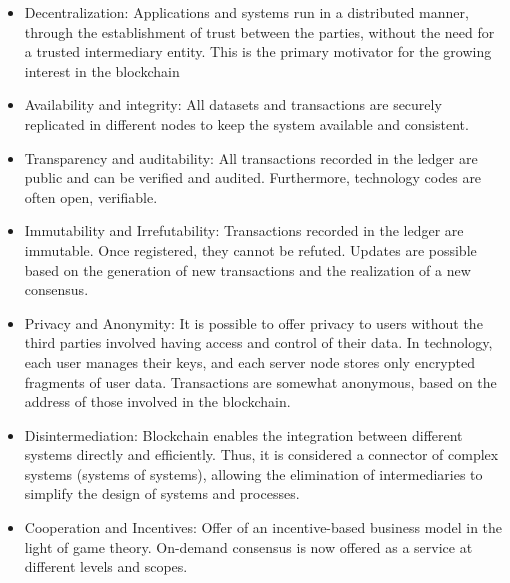 \begin{itemize}
\item Decentralization: Applications and systems run in a distributed manner, through the establishment of trust between the parties, without the need for a trusted intermediary entity. This is the primary motivator for the growing interest in the blockchain
\item Availability and integrity: All datasets and transactions are securely replicated in different nodes to keep the system available and consistent.
\item Transparency and auditability: All transactions recorded in the ledger are public and can be verified and audited. Furthermore, technology codes are often open, verifiable.
\item Immutability and Irrefutability: Transactions recorded in the ledger are immutable. Once registered, they cannot be refuted. Updates are possible based on the generation of new transactions and the realization of a new consensus.
\item Privacy and Anonymity: It is possible to offer privacy to users without the third parties involved having access and control of their data. In technology, each user manages their keys, and each server node stores only encrypted fragments of user data. Transactions are somewhat anonymous, based on the address of those involved in the blockchain.
\item Disintermediation: Blockchain enables the integration between different systems directly and efficiently. Thus, it is considered a connector of complex systems (systems of systems), allowing the elimination of intermediaries to simplify the design of systems and processes.
\item Cooperation and Incentives: Offer of an incentive-based business model in the light of game theory. On-demand consensus is now offered as a service at different levels and scopes.
\end{itemize}

